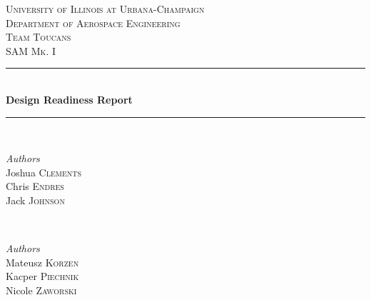 
\begin{titlepage} %
	\newcommand{\HRule}{\rule{\linewidth}{0.5mm}} %
	
	\center %
	
	
	\textsc{\LARGE University of Illinois at Urbana-Champaign\\ \vspace{10pt}Department of Aerospace Engineering}\\[1.5cm] %
	
	\textsc{\Large Team Toucans}\\[0.5cm] %
	
	\textsc{\large SAM Mk. I}\\[0.5cm] %
	
	
	\HRule\\[0.4cm]
	
	{\huge\bfseries Design Readiness Report}\\[0.4cm] %
	
	\HRule\\[1.5cm]
	
	
	\begin{minipage}{0.4\textwidth}
		\begin{flushleft}
			\large
			\textit{Authors}\\
			Joshua \textsc{Clements}\\
			Chris \textsc{Endres}\\
			Jack \textsc{Johnson}\\
		\end{flushleft}
	\end{minipage}
	~
	\begin{minipage}{0.4\textwidth}
		\begin{flushright}
			\large
			\textit{Authors}\\
			Mateusz \textsc{Korzen}\\
			Kacper \textsc{Piechnik}\\
			Nicole \textsc{Zaworski}
		\end{flushright}
	\end{minipage}
	

\end{titlepage}
